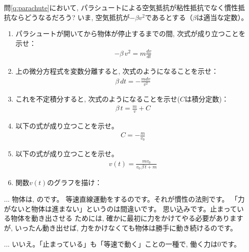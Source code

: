 %
\begin{q}\label{q:parachute2}
問\ref{q:parachute}において, パラシュートによる空気抵抗が粘性抵抗でなく慣性抵抗ならどうなるだろう? 
いま, 空気抵抗が$-\beta v^2$であるとする（$\beta $は適当な定数）。
\begin{enumerate}
\item パラシュートが開いてから物体が停止するまでの間, 次式が成り立つことを示せ：
\begin{eqnarray}
-\beta\,v^2=m\frac{dv}{dt}\label{eq:parachute20}
\end{eqnarray}
\item 上の微分方程式を変数分離すると, 次式のようになることを示せ：
\begin{eqnarray}
\beta\,dt=-\frac{mdv}{v^2}\label{eq:parachute21}
\end{eqnarray}
\item これを不定積分すると, 次式のようになることを示せ($C$は積分定数)：
\begin{eqnarray}
\beta\,t=\frac{m}{v}+C\label{eq:parachute22}
\end{eqnarray}
\item 以下の式が成り立つことを示せ。
\begin{eqnarray}
C=-\frac{m}{v_0}\label{eq:parachute23}
\end{eqnarray}
\item 以下の式が成り立つことを示せ。
\begin{eqnarray}
v(t)=\frac{mv_0}{v_0\,\beta\,t+m}\label{eq:parachute24}
\end{eqnarray}
\item 関数$v(t)$のグラフを描け：
\end{enumerate}
\end{q}
\mv

\begin{faq}{\small{} ... 
物体は, のです。
等速直線運動をするのです。それが慣性の法則です。
「力がないと物体は進まない」というのは間違いです。
思い込みです。止まっている物体を動き出させる
ためには, 確かに最初に力をかけてやる必要がありますが, いったん動き出せば, 
力をかけなくても物体は勝手に動き続けるのです。}\end{faq}\mv

\begin{faq}{\small{} ... 
いいえ。「止まっている」も「等速で動く」ことの一種で, 働く力は0です。}\end{faq}\mv

